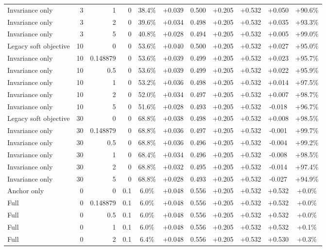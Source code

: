 \begin{table}[htbp]
\begin{tabular}{lrrrccccccc}
Invariance only & 3 & 1 & 0 & 38.4\% & +0.039 & 0.500 & +0.205 & +0.532 & +0.050 & +90.6\% \\
Invariance only & 3 & 2 & 0 & 39.6\% & +0.034 & 0.498 & +0.205 & +0.532 & +0.035 & +93.3\% \\
Invariance only & 3 & 5 & 0 & 40.8\% & +0.028 & 0.494 & +0.205 & +0.532 & +0.005 & +99.0\% \\
Legacy soft objective & 10 & 0 & 0 & 53.6\% & +0.040 & 0.500 & +0.205 & +0.532 & +0.027 & +95.0\% \\
Invariance only & 10 & 0.148879 & 0 & 53.6\% & +0.039 & 0.499 & +0.205 & +0.532 & +0.023 & +95.7\% \\
Invariance only & 10 & 0.5 & 0 & 53.6\% & +0.039 & 0.499 & +0.205 & +0.532 & +0.022 & +95.9\% \\
Invariance only & 10 & 1 & 0 & 53.2\% & +0.036 & 0.498 & +0.205 & +0.532 & +0.014 & +97.5\% \\
Invariance only & 10 & 2 & 0 & 52.0\% & +0.034 & 0.497 & +0.205 & +0.532 & +0.007 & +98.7\% \\
Invariance only & 10 & 5 & 0 & 51.6\% & +0.028 & 0.493 & +0.205 & +0.532 & -0.018 & +96.7\% \\
Legacy soft objective & 30 & 0 & 0 & 68.8\% & +0.038 & 0.498 & +0.205 & +0.532 & +0.008 & +98.5\% \\
Invariance only & 30 & 0.148879 & 0 & 68.8\% & +0.036 & 0.497 & +0.205 & +0.532 & -0.001 & +99.7\% \\
Invariance only & 30 & 0.5 & 0 & 68.8\% & +0.036 & 0.496 & +0.205 & +0.532 & -0.004 & +99.2\% \\
Invariance only & 30 & 1 & 0 & 68.4\% & +0.034 & 0.496 & +0.205 & +0.532 & -0.008 & +98.5\% \\
Invariance only & 30 & 2 & 0 & 68.8\% & +0.032 & 0.495 & +0.205 & +0.532 & -0.014 & +97.4\% \\
Invariance only & 30 & 5 & 0 & 68.8\% & +0.028 & 0.493 & +0.205 & +0.532 & -0.027 & +94.9\% \\
Anchor only & 0 & 0 & 0.1 & 6.0\% & +0.048 & 0.556 & +0.205 & +0.532 & +0.532 & +0.0\% \\
Full & 0 & 0.148879 & 0.1 & 6.0\% & +0.048 & 0.556 & +0.205 & +0.532 & +0.532 & +0.0\% \\
Full & 0 & 0.5 & 0.1 & 6.0\% & +0.048 & 0.556 & +0.205 & +0.532 & +0.532 & +0.0\% \\
Full & 0 & 1 & 0.1 & 6.0\% & +0.048 & 0.556 & +0.205 & +0.532 & +0.532 & +0.1\% \\
Full & 0 & 2 & 0.1 & 6.4\% & +0.048 & 0.556 & +0.205 & +0.532 & +0.530 & +0.3\% \\

\end{tabular}
\end{table}
